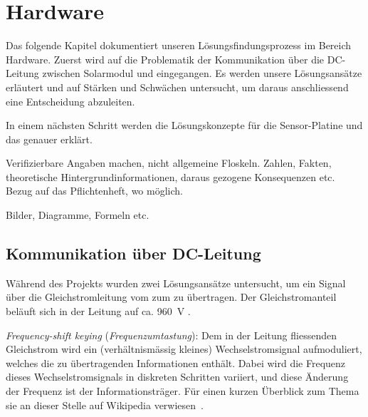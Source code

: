 \chapter{Hardware}
\label{chap:hardware}

Das folgende Kapitel dokumentiert  unseren L\"osungsfindungsprozess im Bereich
Hardware. Zuerst  wird  auf  die  Problematik  der  Kommunikation  \"uber  die
DC-Leitung  zwischen  Solarmodul  und \Master  eingegangen. Es  werden  unsere
L\"osungsans\"atze erl\"autert  und auf St\"arken und  Schw\"achen untersucht,
um daraus anschliessend eine Entscheidung abzuleiten.

In   einem  n\"achsten   Schritt  werden   die  L\"osungskonzepte   f\"ur  die
Sensor-Platine und das \Master genauer erkl\"art.

\anweisung Verifizierbare  Angaben machen, nicht  allgemeine Floskeln. Zahlen,
Fakten,  theoretische Hintergrundinformationen,  daraus gezogene  Konsequenzen
etc. Bezug auf das Pflichtenheft, wo m\"oglich.

\anweisung Bilder, Diagramme, Formeln etc.


\section{Kommunikation \"uber DC-Leitung}
\label{sec:hardware:dcLeitung}

W\"ahrend  des   Projekts  wurden   zwei  L\"osungsans\"atze   untersucht,  um
ein  Signal  \"uber   die  Gleichstromleitung  vom  \Sensor   zum  \Master  zu
\"ubertragen. Der  Gleichstromanteil   bel\"auft  sich  in  der   Leitung  auf
ca. \SI{960}{\volt} .

\myfancybreak

\emph{Frequency-shift    keying}   (\emph{Frequenzumtastung}): Dem    in   der
Leitung    fliessenden    Gleichstrom     wird    ein    (verh\"altnism\"assig
kleines)    Wechselstromsignal    aufmoduliert,
welches   die   zu   \"ubertragenden   Informationen   enth\"alt. Dabei   wird
die    Frequenz   dieses    Wechselstromsignals    in   diskreten    Schritten
variiert,     und  diese   \"Anderung  der  Frequenz   ist  der
Informationstr\"ager.  F\"ur einen kurzen \"Uberblick  zum Thema sie an dieser
Stelle auf Wikipedia verwiesen~\cite{ref:fsk:wikipedia}.


